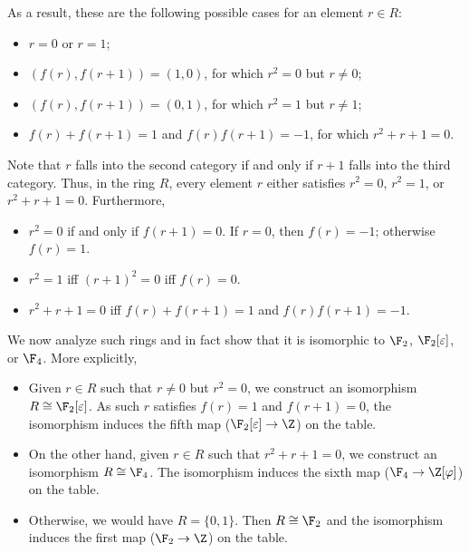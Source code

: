 As a result, these are the following possible cases for an element $r \in R$:
\begin{itemize}
    \item   $r = 0$ or $r = 1$;
    \item   $(f(r), f(r + 1)) = (1, 0)$, for which $r^2 = 0$ but $r \neq 0$;
    \item   $(f(r), f(r + 1)) = (0, 1)$, for which $r^2 = 1$ but $r \neq 1$;
    \item   $f(r) + f(r + 1) = 1$ and $f(r) f(r + 1) = -1$, for which $r^2 + r + 1 = 0$.
\end{itemize}

Note that $r$ falls into the second category if and only if $r + 1$ falls into the third category.
Thus, in the ring $R$, every element $r$ either satisfies $r^2 = 0$, $r^2 = 1$, or $r^2 + r + 1 = 0$.
Furthermore,

\begin{itemize}
    \item   $r^2 = 0$ if and only if $f(r + 1) = 0$.
            If $r = 0$, then $f(r) = -1$; otherwise $f(r) = 1$.
    \item   $r^2 = 1$ iff $(r + 1)^2 = 0$ iff $f(r) = 0$.
    \item   $r^2 + r + 1 = 0$ iff $f(r) + f(r + 1) = 1$ and $f(r) f(r + 1) = -1$.
\end{itemize}

We now analyze such rings and in fact show that it is isomorphic to $\F_2$, $\F_2[\varepsilon]$, or $\F_4$.
More explicitly,

\begin{itemize}
    \item   Given $r \in R$ such that $r \neq 0$ but $r^2 = 0$, we construct an isomorphism $R \cong \F_2[\varepsilon]$.
            As such $r$ satisfies $f(r) = 1$ and $f(r + 1) = 0$, the isomorphism induces the fifth map ($\F_2[\varepsilon] \to \Z$) on the table.
    \item   On the other hand, given $r \in R$ such that $r^2 + r + 1 = 0$, we construct an isomorphism $R \cong \F_4$.
            The isomorphism induces the sixth map ($\F_4 \to \Z[\varphi]$) on the table.
    \item   Otherwise, we would have $R = \{0, 1\}$.
            Then $R \cong \F_2$ and the isomorphism induces the first map ($\F_2 \to \Z$) on the table.
\end{itemize}

